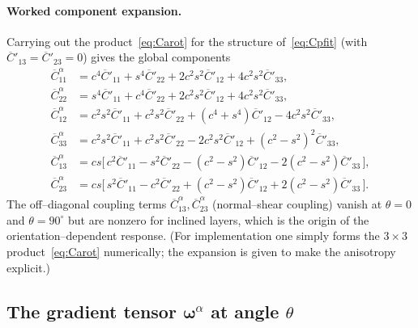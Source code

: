 \documentclass[12pt,a4paper]{article}
\newcommand{\bomega}{\boldsymbol{\omega}}
\begin{document}
	\paragraph{Worked component expansion.}
	Carrying out the product~\eqref{eq:Carot} for the structure of~\eqref{eq:Cpfit}
	(with $\overline{C}'_{13}=\overline{C}'_{23}=0$) gives the global components
	\begin{align}
		\overline{C}^{\alpha}_{11} &= c^4\overline{C}'_{11} + s^4\overline{C}'_{22}
		+ 2c^2s^2\overline{C}'_{12} + 4c^2s^2\overline{C}'_{33}, \label{eq:Cglob11}\\
		\overline{C}^{\alpha}_{22} &= s^4\overline{C}'_{11} + c^4\overline{C}'_{22}
		+ 2c^2s^2\overline{C}'_{12} + 4c^2s^2\overline{C}'_{33}, \label{eq:Cglob22}\\
		\overline{C}^{\alpha}_{12} &= c^2s^2\overline{C}'_{11} + c^2s^2\overline{C}'_{22}
		+ (c^4+s^4)\overline{C}'_{12} - 4c^2s^2\overline{C}'_{33}, \label{eq:Cglob12}\\
		\overline{C}^{\alpha}_{33} &= c^2s^2\overline{C}'_{11} + c^2s^2\overline{C}'_{22}
		- 2c^2s^2\overline{C}'_{12} + (c^2-s^2)^2\overline{C}'_{33}, \label{eq:Cglob33}\\
		\overline{C}^{\alpha}_{13} &= cs\bigl[\,c^2\overline{C}'_{11}
		- s^2\overline{C}'_{22} - (c^2-s^2)\overline{C}'_{12}
		- 2(c^2-s^2)\overline{C}'_{33}\,\bigr], \label{eq:Cglob13}\\
		\overline{C}^{\alpha}_{23} &= cs\bigl[\,s^2\overline{C}'_{11}
		- c^2\overline{C}'_{22} + (c^2-s^2)\overline{C}'_{12}
		+ 2(c^2-s^2)\overline{C}'_{33}\,\bigr]. \label{eq:Cglob23}
	\end{align}
	The off--diagonal coupling terms $\overline{C}^{\alpha}_{13},
	\overline{C}^{\alpha}_{23}$ (normal--shear coupling) vanish at $\theta=0$ and
	$\theta=90^\circ$ but are nonzero for inclined layers, which is the origin of
	the orientation--dependent response. (For implementation one simply forms the
	$3\times3$ product~\eqref{eq:Carot} numerically; the expansion is given to make
	the anisotropy explicit.)

	\subsection{\texorpdfstring{The gradient tensor $\bomega^{\alpha}$ at angle $\theta$}{The gradient tensor omega-alpha at angle theta}}
\end{document}
